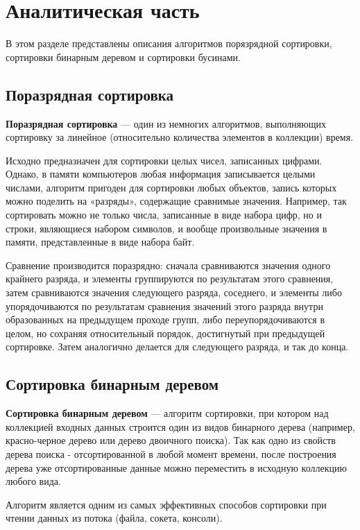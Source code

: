 \chapter{Аналитическая часть}
В этом разделе представлены описания алгоритмов порязрядной сортировки,
сортировки бинарным деревом и сортировки бусинами.

\section{Поразрядная сортировка}

\textbf{Поразрядная сортировка}\cite{sheyker} — один из немногих алгоритмов,
выполняющих сортировку за линейное (относительно количества элементов в
коллекции) время.


Исходно предназначен для сортировки целых чисел, записанных цифрами.
Однако, в памяти компьютеров любая информация записывается целыми числами,
алгоритм пригоден для сортировки любых объектов, запись которых можно поделить
на «разряды», содержащие сравнимые значения. Например, так сортировать можно
не только числа, записанные в виде набора цифр, но и строки, являющиеся набором
символов, и вообще произвольные значения в памяти, представленные в виде
набора байт.


Сравнение производится поразрядно: сначала сравниваются значения одного
крайнего разряда, и элементы группируются по результатам этого сравнения,
затем сравниваются значения следующего разряда, соседнего, и элементы либо
упорядочиваются по результатам сравнения значений этого разряда внутри
образованных на предыдущем проходе групп, либо переупорядочиваются в
целом, но сохраняя относительный порядок, достигнутый при предыдущей
сортировке. Затем аналогично делается для следующего разряда, и так до конца.


\section{Сортировка бинарным деревом}

\textbf{Сортировка бинарным деревом}\cite{insert} — алгоритм сортировки,
при котором над коллекцией входных данных строится один из видов бинарного
дерева (например, красно-черное дерево или дерево двоичного поиска). Так как
одно из свойств дерева поиска - отсортированной в любой момент времени, после
построения дерева уже отсортированные данные можно переместить в исходную
коллекцию любого вида.


Алгоритм является одним из самых эффективных
способов сортировки при чтении данных из потока (файла, сокета, консоли).


